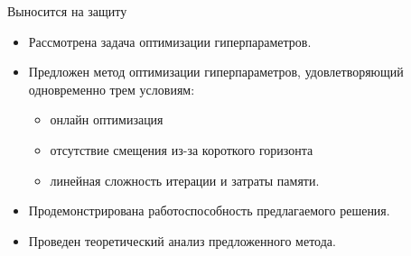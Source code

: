 \documentclass[aspectratio=169]{beamer}
\begin{document}
\begin{frame}{Выносится на защиту}
    \begin{itemize}
      \item Рассмотрена задача оптимизации гиперпараметров.
      \item Предложен метод оптимизации гиперпараметров, удовлетворяющий одновременно трем условиям:
      \begin{itemize}
        \item онлайн оптимизация
        \item отсутствие смещения из-за короткого горизонта
        \item линейная сложность итерации и затраты памяти.
      \end{itemize}
      \item Продемонстрирована работоспособность предлагаемого решения.
      \item Проведен теоретический анализ предложенного метода.
    \end{itemize}
\end{frame}



\end{document}
